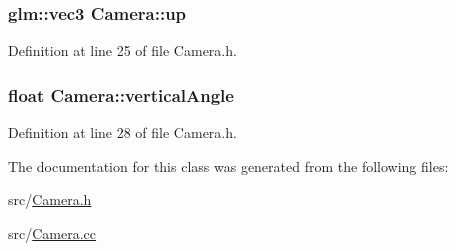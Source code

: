 \subsubsection[{up}]{\setlength{\rightskip}{0pt plus 5cm}glm\+::vec3 Camera\+::up\hspace{0.3cm}{\ttfamily [private]}}\label{class_camera_a3fe5f351380fb118ffc600591769f049}


Definition at line 25 of file Camera.\+h.

\hypertarget{class_camera_a6582a5068d81b8de7a7fc67e5143e628}{}
\subsubsection[{vertical\+Angle}]{\setlength{\rightskip}{0pt plus 5cm}float Camera\+::vertical\+Angle\hspace{0.3cm}{\ttfamily [private]}}\label{class_camera_a6582a5068d81b8de7a7fc67e5143e628}


Definition at line 28 of file Camera.\+h.



The documentation for this class was generated from the following files\+:\begin{DoxyCompactItemize}
\item 
src/\hyperlink{_camera_8h}{Camera.\+h}\item 
src/\hyperlink{_camera_8cc}{Camera.\+cc}\end{DoxyCompactItemize}
